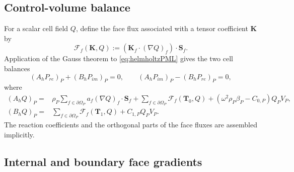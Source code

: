 \documentclass[final,12pt,nopreprintline,longtitle]{elsarticle}
\newcommand{\Sf}{\mathbf{S}_f}
\newcommand{\betaac}{\beta}
\begin{document}
\subsection{Control-volume balance}

For a scalar cell field $Q$, define the face flux associated with a tensor
coefficient $\mathbf{K}$ by
\begin{equation}
    \mathcal{F}_f(\mathbf{K},Q)
    :=\left(\mathbf{K}_f\cdot(\nabla Q)_f\right)\cdot\Sf.
    \label{eq:genericFaceFlux}
\end{equation}
Application of the Gauss theorem to \cref{eq:helmholtzPML} gives the two
cell balances
\begin{equation}
    (A_hP_{re})_P+(B_hP_{im})_P=0,
    \qquad
    (A_hP_{im})_P-(B_hP_{re})_P=0,
    \label{eq:discreteCellBalances}
\end{equation}
where
\begin{equation}
\begin{aligned}
    (A_hQ)_P={}&
        \rho_P\sum_{f\in\partial\Omega_P}
        a_f(\nabla Q)_f\cdot\Sf
        +\sum_{f\in\partial\Omega_P}
        \mathcal{F}_f(\mathbf{T}_0,Q)
        +(\omega^2\rho_P\betaac_P-C_{0,P})Q_PV_P,\\
    (B_hQ)_P={}&
        \sum_{f\in\partial\Omega_P}
        \mathcal{F}_f(\mathbf{T}_1,Q)
        +C_{1,P}Q_PV_P.
\end{aligned}
\label{eq:discreteOperators}
\end{equation}
The reaction coefficients and the orthogonal parts of the face fluxes are
assembled implicitly.

\subsection{Internal and boundary face gradients}
\end{document}
